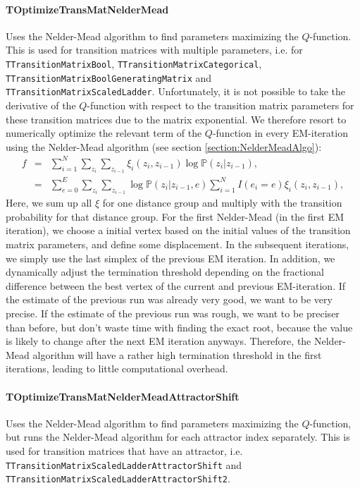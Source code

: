 \documentclass[a4paper,11pt]{article}
\def\p{\mathbb{P}}
\newcommand{\class}[1]{\texttt{#1}}
\begin{document}
\paragraph{TOptimizeTransMatNelderMead} Uses the Nelder-Mead algorithm to find parameters maximizing the $Q$-function. This is used for transition matrices with multiple parameters, i.e. for \class{TTransitionMatrixBool}, \class{TTransitionMatrixCategorical}, \class{TTransitionMatrixBoolGeneratingMatrix} and \class{TTransitionMatrixScaledLadder}. Unfortunately, it is not possible to take the derivative of the $Q$-function with respect to the transition matrix parameters for these transition matrices due to the matrix exponential. We therefore resort to numerically optimize the relevant term of the $Q$-function in every EM-iteration using the Nelder-Mead algorithm (see section \ref{section:NelderMeadAlgo}):
\begin{eqnarray*}
 f &=& \sum_{i=1}^N \sum_{z_i}\sum_{z_{i-1}}\xi_i(z_i, z_{i-1})\log\p(z_i | z_{i-1}),\\
 &=& \sum_{e=0}^E \sum_{z_i}\sum_{z_{i-1}} \log\p(z_i | z_{i-1}, e) \sum_{i=1}^N I(e_i = e) \xi_i(z_i, z_{i-1}),
\end{eqnarray*}
Here, we sum up all $\xi$ for one distance group and multiply with the transition probability for that distance group. For the first Nelder-Mead (in the first EM iteration), we choose a initial vertex based on the initial values of the transition matrix parameters, and define some displacement. In the subsequent iterations, we simply use the last simplex of the previous EM iteration. In addition, we dynamically adjust the termination threshold depending on the fractional difference between the best vertex of the current and previous EM-iteration. If the estimate of the previous run was already very good, we want to be very precise. If the estimate of the previous run was rough, we want to be preciser than before, but don't waste time with finding the exact root, because the value is likely to change after the next EM iteration anyways. Therefore, the Nelder-Mead algorithm will have a rather high termination threshold in the first iterations, leading to little computational overhead.

\paragraph{TOptimizeTransMatNelderMeadAttractorShift}
Uses the Nelder-Mead algorithm to find parameters maximizing the $Q$-function, but runs the Nelder-Mead algorithm for each attractor index separately. This is used for transition matrices that have an attractor, i.e. \class{TTransitionMatrixScaledLadderAttractorShift} and \class{TTransitionMatrixScaledLadderAttractorShift2}.
\end{document}
